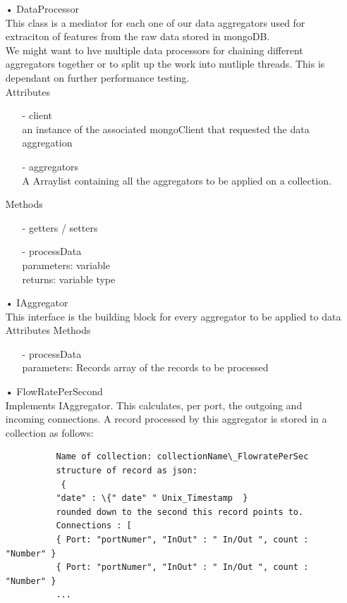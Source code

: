 \documentclass[oneside, english, final]{design}
\begin{document}
\begin{itemize}
	\item[•]DataProcessor
	      \\This class is a mediator for each one of our data aggregators used for extraciton of features from the raw data stored in mongoDB.
	      \\ We might want to hve multiple data processors for chaining different aggregators together or to split up the work into mutliple threads. This is dependant on further performance testing.
	      \\Attributes
	      \begin{itemize}
		      \item[-] client
		            \\ an instance of the associated mongoClient that requested the data aggregation
		      \item[-] aggregators
		            \\ A Arraylist containing all the aggregators to be applied on a collection.
	      \end{itemize}
	      Methods
	      \begin{itemize}
		      \item[-]getters / setters
		      \item[-]processData
		            \\parameters: variable
		            \\returns: variable type
	      \end{itemize}
	\item[•] IAggregator
	      \\This interface is the building block for every aggregator to be applied to data
	      \\Attributes
	      Methods
	      \begin{itemize}
		      \item[-]processData
		            \\parameters: Records array of the records to be processed
	      \end{itemize}

	\item[•] FlowRatePerSecond
	      \\Implements IAggregator. This calculates, per port, the outgoing and incoming connections.
	      A record processed by this aggregator is stored in a collection as follows:
	      \begin{verbatim} 
		  Name of collection: collectionName\_FlowratePerSec
		  structure of record as json:
		   {
		  "date" : \{" date" " Unix_Timestamp  } 
		  rounded down to the second this record points to.
		  Connections : [
		  { Port: "portNumer", "InOut" : " In/Out ", count : "Number" }
		  { Port: "portNumer", "InOut" : " In/Out ", count : "Number" }
		  ...
		  

\end{verbatim}
\end{itemize}
\end{document}
